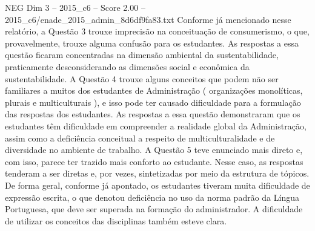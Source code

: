 \begin{textsample}{NEG Dim 3 – 2015\_c6 – Score 2.00 – 2015\_c6/enade\_2015\_admin\_8d6df9fa83.txt}
Conforme já mencionado nesse relatório, a Questão 3 trouxe imprecisão na conceituação de consumerismo, o que, provavelmente, trouxe alguma confusão para os estudantes.
As respostas a essa questão ficaram concentradas na dimensão ambiental da sustentabilidade, praticamente desconsiderando as dimensões social e econômica da sustentabilidade.
A Questão 4 trouxe alguns conceitos que podem não ser familiares a muitos dos estudantes de Administração ( organizações monolíticas, plurais e multiculturais ), e isso pode ter causado dificuldade para a formulação das respostas dos estudantes.
As respostas a essa questão demonstraram que os estudantes têm dificuldade em compreender a realidade global da Administração, assim como a deficiência conceitual a respeito de multiculturalidade e de diversidade no ambiente de trabalho.
A Questão 5 teve enunciado mais direto e, com isso, parece ter trazido mais conforto ao estudante.
Nesse caso, as respostas tenderam a ser diretas e, por vezes, sintetizadas por meio da estrutura de tópicos.
De forma geral, conforme já apontado, os estudantes tiveram muita dificuldade de expressão escrita, o que denotou deficiência no uso da norma padrão da Língua Portuguesa, que deve ser superada na formação do administrador.
A dificuldade de utilizar os conceitos das disciplinas também esteve clara.

\end{textsample}
